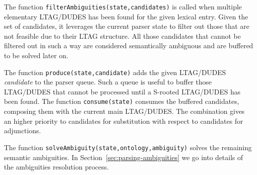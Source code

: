 The function \texttt{filterAmbiguities(state,candidates)} is called when multiple elementary LTAG/DUDES has been found for the given lexical entry.
%
Given the set of candidates, it leverages the current parser state to filter out those that are not feasible due to their LTAG structure.
%
All those candidates that cannot be filtered out in such a way are considered semantically ambiguous and are buffered to be solved later on.

The function \texttt{produce(state,candidate)} adds the given LTAG/DUDES \textit{candidate} to the parser queue. Such a queue is useful to buffer those LTAG/DUDES that cannot be processed until a S-rooted LTAG/DUDES has been found.
%
The function \texttt{consume(state)} consumes the buffered candidates, composing them with the current main LTAG/DUDES. The combination gives an higher priority to candidates for substitution with respect to candidates for adjunctions.

The function \texttt{solveAmbiguity(state,ontology,ambiguity)} solves the remaining semantic ambiguities. In Section~\ref{sec:parsing-ambiguities} we go into details of the ambiguities resolution process.